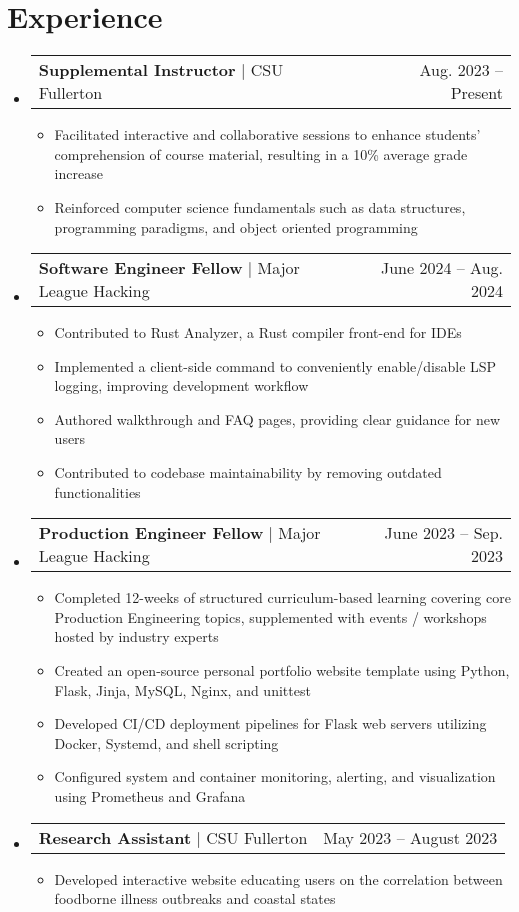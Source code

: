 \documentclass[letterpaper,11pt]{article}
\makeatletter
\newcommand{\resumeItem}[1]{
  \item\small{
    {#1 \vspace{-2pt}}
  }
}
\newcommand{\resumeProjectHeading}[2]{
    \item
    \begin{tabular*}{0.97\textwidth}{l@{\extracolsep{\fill}}r}
      \small#1 & #2 \\
    \end{tabular*}\vspace{-7pt}
}
\newcommand{\resumeSubHeadingListStart}{\begin{itemize}[leftmargin=0.15in, label={}]}
\newcommand{\resumeSubHeadingListEnd}{\end{itemize}}
\newcommand{\resumeItemListStart}{\begin{itemize}}
\newcommand{\resumeItemListEnd}{\end{itemize}\vspace{-5pt}}
\makeatother
\begin{document}
\section{Experience}
  \resumeSubHeadingListStart
    \resumeProjectHeading
            {\textbf{Supplemental Instructor} $|$ {CSU Fullerton}}{Aug. 2023 -- Present}
            \resumeItemListStart
              \resumeItem{Facilitated interactive and collaborative sessions to enhance students' comprehension of course material, resulting in a 10\% average grade increase}
              \resumeItem{Reinforced computer science fundamentals such as data structures, programming paradigms, and object oriented programming}
    \resumeItemListEnd
    \resumeProjectHeading
          {\textbf{Software Engineer Fellow} $|$ {Major League Hacking}}{June 2024 -- Aug. 2024}
          \resumeItemListStart
            \resumeItem{Contributed to Rust Analyzer, a Rust compiler front-end for IDEs}
            \resumeItem{Implemented a client-side command to conveniently enable/disable LSP logging, improving development workflow}
            \resumeItem{Authored walkthrough and FAQ pages, providing clear guidance for new users}
            \resumeItem{Contributed to codebase maintainability by removing outdated functionalities}
          \resumeItemListEnd
    \resumeProjectHeading
          {\textbf{Production Engineer Fellow} $|$ {Major League Hacking}}{June 2023 -- Sep. 2023}
          \resumeItemListStart
            \resumeItem{Completed 12-weeks of structured curriculum-based learning covering core Production Engineering topics, supplemented with events / workshops hosted by industry experts}
            \resumeItem{Created an open-source personal portfolio website template using Python, Flask, Jinja, MySQL, Nginx, and unittest}
            \resumeItem{Developed CI/CD deployment pipelines for Flask web servers utilizing Docker, Systemd, and shell scripting}
            \resumeItem{Configured system and container monitoring, alerting, and visualization using Prometheus and Grafana}
          \resumeItemListEnd
    \resumeProjectHeading
          {\textbf{Research Assistant} $|$ {CSU Fullerton}}{May 2023 -- August 2023}
          \resumeItemListStart
            \resumeItem{Developed interactive website educating users on the correlation between foodborne illness outbreaks and coastal states}
          \resumeItemListEnd
  \resumeSubHeadingListEnd

\end{document}

